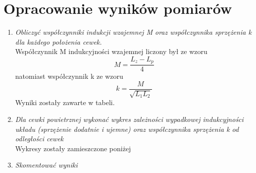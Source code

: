\documentclass[a4paper,10pt,twoside]{article}
\begin{document}
	\section{Opracowanie wyników pomiarów}
	\begin{enumerate}
		\item \textit{Obliczyć
			współczynniki  indukcji  wzajemnej 
			M
			oraz  współczynnika  sprzężenia 
			k
			dla  każdego  położenia 
			cewek. }\vspace{10pt}
		\\ Współczynnik M indukcyjności wzajemnej liczony był ze wzoru 
		$$ M = \frac{L_z - L_p}{4}$$ natomiast współczynnik k ze wzoru 
		$$k = \frac{M}{\sqrt{L_1 L_2}} $$ Wyniki zostały zawarte w tabeli.
		\item \textit{ Dla  cewki  powietrznej  wykonać
		wykres  zależności  wypadkowej  indukcyjności  układu  (sprzężenie  dodatnie
		i ujemne) oraz współczynnika sprzężenia 
		k
		od odległości cewek}\vspace{10pt} \\Wykresy zostały zamieszczone poniżej
		\item \textit{Skomentować wyniki}
	\end{enumerate}
	\begin{figure}[H]
	\end{figure}
		\begin{figure}[H]
	\end{figure}
\end{document}
